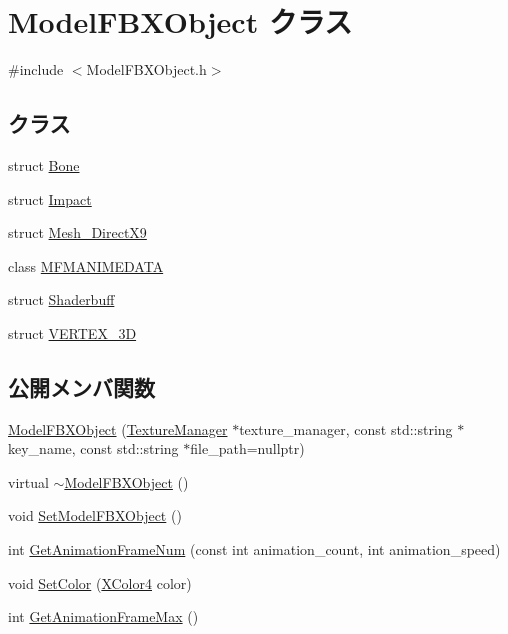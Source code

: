 \hypertarget{class_model_f_b_x_object}{}\section{Model\+F\+B\+X\+Object クラス}
\label{class_model_f_b_x_object}


{\ttfamily \#include $<$Model\+F\+B\+X\+Object.\+h$>$}

\subsection*{クラス}
\begin{DoxyCompactItemize}
\item 
struct \mbox{\hyperlink{struct_model_f_b_x_object_1_1_bone}{Bone}}
\item 
struct \mbox{\hyperlink{struct_model_f_b_x_object_1_1_impact}{Impact}}
\item 
struct \mbox{\hyperlink{struct_model_f_b_x_object_1_1_mesh___direct_x9}{Mesh\+\_\+\+Direct\+X9}}
\item 
class \mbox{\hyperlink{class_model_f_b_x_object_1_1_m_f_m_a_n_i_m_e_d_a_t_a}{M\+F\+M\+A\+N\+I\+M\+E\+D\+A\+TA}}
\item 
struct \mbox{\hyperlink{struct_model_f_b_x_object_1_1_shaderbuff}{Shaderbuff}}
\item 
struct \mbox{\hyperlink{struct_model_f_b_x_object_1_1_v_e_r_t_e_x__3_d}{V\+E\+R\+T\+E\+X\+\_\+3D}}
\end{DoxyCompactItemize}
\subsection*{公開メンバ関数}
\begin{DoxyCompactItemize}
\item 
\mbox{\hyperlink{class_model_f_b_x_object_a45586ead07b17f4a90ba320c41d7f1c3}{Model\+F\+B\+X\+Object}} (\mbox{\hyperlink{class_texture_manager}{Texture\+Manager}} $\ast$texture\+\_\+manager, const std\+::string $\ast$key\+\_\+name, const std\+::string $\ast$file\+\_\+path=nullptr)
\item 
virtual \mbox{\hyperlink{class_model_f_b_x_object_a3fa838235e50d797539d6b266f8e2c96}{$\sim$\+Model\+F\+B\+X\+Object}} ()
\item 
void \mbox{\hyperlink{class_model_f_b_x_object_a3c101cf65da1bdb55b7a11e71cefcad0}{Set\+Model\+F\+B\+X\+Object}} ()
\item 
int \mbox{\hyperlink{class_model_f_b_x_object_a87516b4e5aa6341188e47f956d4a180f}{Get\+Animation\+Frame\+Num}} (const int animation\+\_\+count, int animation\+\_\+speed)
\item 
void \mbox{\hyperlink{class_model_f_b_x_object_acbe9d90631a3ac39b9cf65097c39aaa9}{Set\+Color}} (\mbox{\hyperlink{_vector3_d_8h_a680c30c4a07d86fe763c7e01169cd6cc}{X\+Color4}} color)
\item 
int \mbox{\hyperlink{class_model_f_b_x_object_abbeaa886c4f8f6c0d1608d58cc013226}{Get\+Animation\+Frame\+Max}} ()
\end{DoxyCompactItemize}
